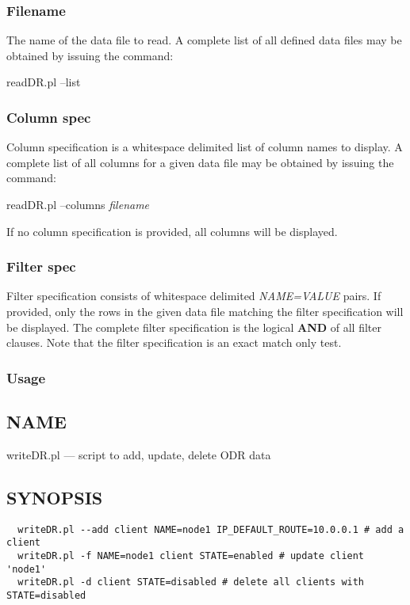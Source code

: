\subsubsection*{Filename}%

The name of the data file to read. A complete list of all defined data files may
be obtained by issuing the command:

readDR.pl --list

\subsubsection*{Column spec}%

Column specification is a whitespace delimited list of column names to display.
A complete list of all columns for a given data file may be obtained by issuing
the command:

readDR.pl --columns {\em filename\/}

If no column specification is provided, all columns will be displayed.

\subsubsection*{Filter spec}%

Filter specification consists of whitespace delimited {\em NAME=VALUE\/} pairs. If provided,
only the rows in the given data file matching the filter specification will be displayed.
The complete filter specification is the logical {\bf AND} of all filter clauses. Note
that the filter specification is an exact match only test.

\subsubsection{ Usage}

\subsection*{NAME}
writeDR.pl --- script to add, update, delete ODR data

\subsection*{SYNOPSIS}\begin{verbatim}
  writeDR.pl --add client NAME=node1 IP_DEFAULT_ROUTE=10.0.0.1 # add a client
  writeDR.pl -f NAME=node1 client STATE=enabled # update client 'node1'
  writeDR.pl -d client STATE=disabled # delete all clients with STATE=disabled
\end{verbatim}

